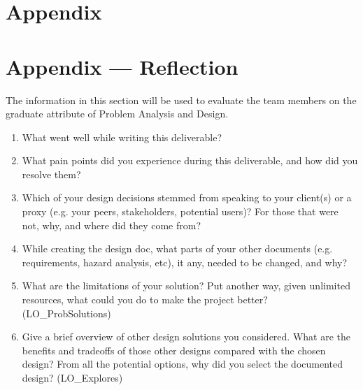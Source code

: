 \documentclass[12pt, titlepage]{article}
\begin{document}
\section{Appendix} \label{Appendix}


\newpage{}

\section*{Appendix --- Reflection}


The information in this section will be used to evaluate the team members on the
graduate attribute of Problem Analysis and Design.



\begin{enumerate}
  \item What went well while writing this deliverable? 
  \item What pain points did you experience during this deliverable, and how
    did you resolve them?
  \item Which of your design decisions stemmed from speaking to your client(s)
  or a proxy (e.g. your peers, stakeholders, potential users)? For those that
  were not, why, and where did they come from?
  \item While creating the design doc, what parts of your other documents (e.g.
  requirements, hazard analysis, etc), it any, needed to be changed, and why?
  \item What are the limitations of your solution?  Put another way, given
  unlimited resources, what could you do to make the project better? (LO\_ProbSolutions)
  \item Give a brief overview of other design solutions you considered.  What
  are the benefits and tradeoffs of those other designs compared with the chosen
  design?  From all the potential options, why did you select the documented design?
  (LO\_Explores)
\end{enumerate}
\end{document}
